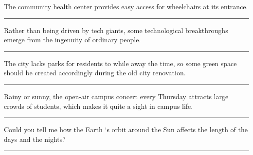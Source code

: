 \documentclass[11pt,a4paper]{article}
\newcommand{\num}[1]{\makebox[1.9em][r]{#1.}\hspace{0.3em}}
\newcommand{\wline}{\noindent\rule{\linewidth}{0.4pt}}
\begin{document}
\vspace{0.35em}\vspace{0.15em}

\begin{minipage}{\linewidth}

\num{29}The community health center provides easy access for wheelchairs at its entrance.

\vspace{0.25em}

\wline

\end{minipage}

\begin{minipage}{\linewidth}

\num{30}Rather than being driven by tech giants, some technological breakthroughs emerge from the ingenuity of ordinary people.

\vspace{0.25em}

\wline

\end{minipage}

\begin{minipage}{\linewidth}

\num{31}The city lacks parks for residents to while away the time, so some green space should be created accordingly during the old city renovation.

\vspace{0.25em}

\wline

\end{minipage}

\begin{minipage}{\linewidth}

\num{32}Rainy or sunny, the open-air campus concert every Thursday attracts large crowds of students, which makes it quite a sight in campus life.

\vspace{0.25em}

\wline

\end{minipage}

\vspace{0.35em}\vspace{0.15em}

\begin{minipage}{\linewidth}

\num{33}Could you tell me how the Earth ‘s orbit around the Sun affects the length of the days and the nights?

\vspace{0.25em}

\wline

\end{minipage}
\end{document}
